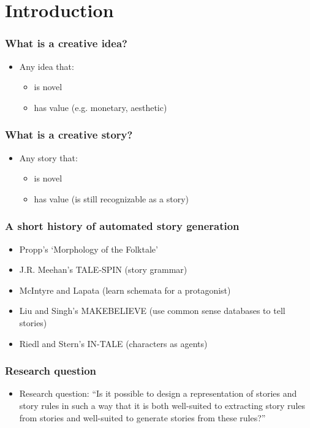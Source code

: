\section{Introduction}

\begin{frame}
	\frametitle{What is a creative idea?}
	\begin{itemize}
		\item Any idea that:
		\begin{itemize}
			\pause
			\item is novel
			\pause
			\item has value (e.g. monetary, aesthetic)
		\end{itemize}
	\end{itemize}
\end{frame}

\begin{frame}
	\frametitle{What is a creative story?}
	\begin{itemize}
		\item Any story that:
		\begin{itemize}
			\pause
			\item is novel
			\pause
			\item has value (is still recognizable as a story)
		\end{itemize}
	\end{itemize}
\end{frame}

\begin{frame}
	\frametitle{A short history of automated story generation}
	\begin{itemize}
		\item Propp's `Morphology of the Folktale'
		\item J.R. Meehan's TALE-SPIN (story grammar)
		\item McIntyre and Lapata (learn schemata for a protagonist)
		\item Liu and Singh's MAKEBELIEVE (use common sense databases to tell stories)
		\item Riedl and Stern's IN-TALE (characters as agents)
	\end{itemize}
\end{frame}

\begin{frame}
	\frametitle{Research question}
	\begin{itemize}
		\item Research question: ``Is it possible to design a
		representation of stories and story rules in such a way that it is both
		well-suited to extracting story rules from stories and well-suited
		to generate stories from these rules?''
	\end{itemize}
\end{frame}
